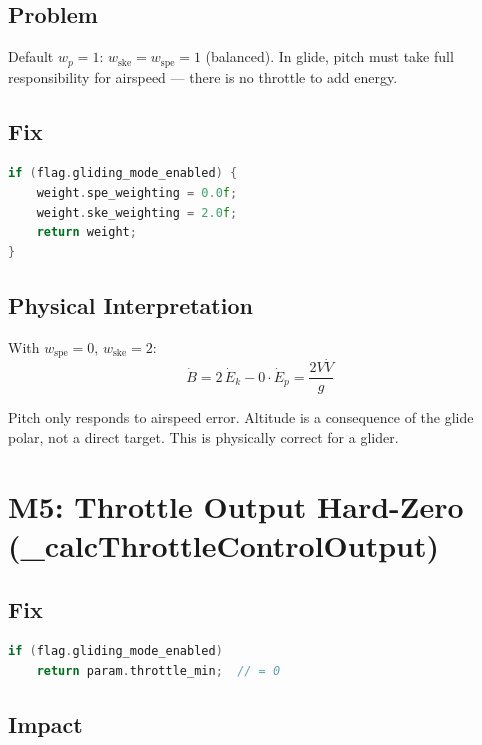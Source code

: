 \documentclass[12pt,a4paper]{article}
\begin{document}
\subsection{Problem}

Default $w_p = 1$: $w_{\text{ske}} = w_{\text{spe}} = 1$ (balanced).
In glide, pitch must take full responsibility for airspeed --- there is
no throttle to add energy.

\subsection{Fix}

\begin{lstlisting}[language=C++]
if (flag.gliding_mode_enabled) {
    weight.spe_weighting = 0.0f;
    weight.ske_weighting = 2.0f;
    return weight;
}
\end{lstlisting}

\subsection{Physical Interpretation}

With $w_{\text{spe}} = 0$, $w_{\text{ske}} = 2$:
\begin{equation}
  \dot{B} = 2\,\dot{E}_k - 0\cdot\dot{E}_p = \frac{2V\dot{V}}{g}
\end{equation}

Pitch only responds to airspeed error. Altitude is a consequence of the
glide polar, not a direct target. This is physically correct for a glider.

\section{M5: Throttle Output Hard-Zero (\_calcThrottleControlOutput)}

\subsection{Fix}

\begin{lstlisting}[language=C++]
if (flag.gliding_mode_enabled)
    return param.throttle_min;  // = 0
\end{lstlisting}

\subsection{Impact}
\end{document}
